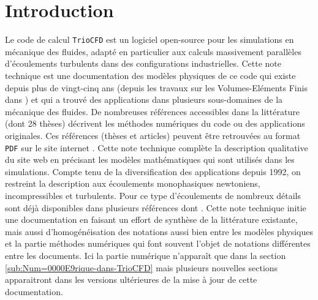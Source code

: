 \section{Introduction}

Le code de calcul \texttt{TrioCFD} est un logiciel open-source \cite{TrioCFD}
pour les simulations en m\'ecanique des fluides, adapt\'e en particulier
aux calculs massivement parall\`eles d\textquoteright \'ecoulements turbulents
dans des configurations industrielles. Cette note technique est une
documentation des mod\`eles physiques de ce code qui existe depuis plus
de vingt-cinq ans (depuis les travaux sur les Volumes-El\'ements Finis
dans \cite{Emon92}) et qui a trouv\'e des applications dans plusieurs
sous-domaines de la m\'ecanique des fluides. De nombreuses r\'ef\'erences
accessibles dans la litt\'erature (dont 28 th\`eses) d\'ecrivent les m\'ethodes
num\'eriques du code ou des applications originales. Ces r\'ef\'erences
(th\`eses et articles) peuvent \^etre retrouv\'ees au format \texttt{PDF}
sur le site internet \cite{TrioCFD}. Cette note technique compl\`ete
la description qualitative du site web en pr\'ecisant les mod\`eles math\'ematiques
qui sont utilis\'es dans les simulations. Compte tenu de la diversification
des applications depuis 1992, on restreint la description aux \'ecoulements
monophasiques newtoniens, incompressibles et turbulents. Pour ce type
d'\'ecoulements de nombreux d\'etails sont d\'ej\`a disponibles dans plusieurs
r\'ef\'erences dont \cite[etc ...]{Angeli_etal_NURETH2015,Angeli_etal_FVCA2017,TrioCFD}.
Cette note technique initie une documentation en faisant un effort
de synth\`ese de la litt\'erature existante, mais aussi d'homog\'en\'eisation
des notations aussi bien entre les \og mod\`eles physiques \fg{} et
la partie \og m\'ethodes num\'eriques \fg{} qui font souvent l'objet
de notations diff\'erentes entre les documents. Ici la partie num\'erique
n'appara\^it que dans la section \ref{sub:Num=0000E9rique-dans-TrioCFD}
mais plusieurs nouvelles sections apparaitront dans les versions ult\'erieures
de la mise \`a jour de cette documentation.

